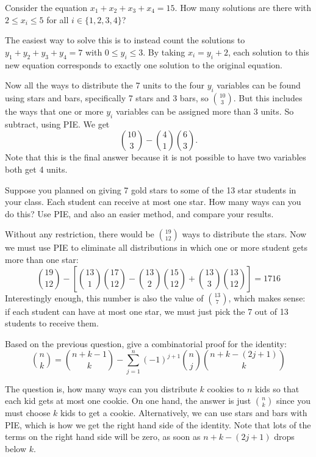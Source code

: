 \begin{questions}
\question Consider the equation $x_1 + x_2 + x_3 + x_4 = 15$.  How many solutions are there with $2 \le x_i \le 5$ for all $i \in \{1,2,3,4\}$?

	\begin{answer}
	The easiest way to solve this is to instead count the solutions to $y_1 + y_2 + y_3 + y_4 = 7$ with $0 \le y_i \le 3$.  By taking $x_i = y_i+2$, each solution to this new equation corresponds to exactly one solution to the original equation.  
	
	Now all the ways to distribute the 7 units to the four $y_i$ variables can be found using stars and bars, specifically 7 stars and 3 bars, so ${10 \choose 3}$.  But this includes the ways that one or more $y_i$ variables can be assigned more than 3 units.  So subtract, using PIE.  We get 
	\[{10 \choose 3} - {4\choose 1} {6 \choose 3}.\]
	Note that this is the final answer because it is not possible to have two variables both get 4 units.
	\end{answer}


\question Suppose you planned on giving 7 gold stars to some of the 13 star students in your class.  Each student can receive at most one star.  How many ways can you do this?  Use PIE, and also an easier method, and compare your results.

	\begin{answer}
		Without any restriction, there would be ${19\choose 12}$ ways to distribute the stars.  Now we must use PIE to eliminate all distributions in which one or more student gets more than one star:
		\[{19 \choose 12} - \left[{13 \choose 1}{17 \choose 12} - {13\choose 2}{15 \choose 12} + {13\choose 3}{13 \choose 12}\right] = 1716\]
		Interestingly enough, this number is also the value of ${13 \choose 7}$, which makes sense: if each student can have at most one star, we must just pick the 7 out of 13 students to receive them.
	\end{answer}



\question Based on the previous question, give a combinatorial proof for the identity:
\[{n \choose k} = {n+k-1 \choose k} - \sum_{j=1}^n (-1)^{j+1}{n \choose j}{n+k-(2j+1) \choose k}\]

	\begin{answer}
	The question is, how many ways can you distribute $k$ cookies to $n$ kids so that each kid gets at most one cookie.  On one hand, the answer is just ${n \choose k}$ since you must choose $k$ kids to get a cookie.  Alternatively, we can use stars and bars with PIE, which is how we get the right hand side of the identity.  Note that lots of the terms on the right hand side will be zero, as soon as $n+k-(2j+1)$ drops below $k$. 
	\end{answer}




\end{questions}
